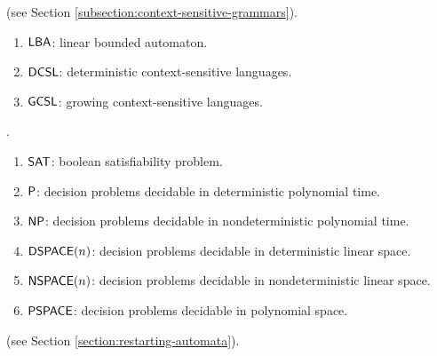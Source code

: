  (see Section \ref{subsection:context-sensitive-grammars}).

\begin{enumerate}[]
\item $\textup{\sf LBA}$: linear bounded automaton.
\item $\textup{\sf DCSL}$: deterministic context-sensitive languages.
\item $\textup{\sf GCSL}$: growing context-sensitive languages.
\end{enumerate}

.

\begin{enumerate}[]
\item $\textup{\sf SAT}$: boolean satisfiability problem.
\item $\textup{\sf P}$: decision problems decidable in deterministic polynomial time.
\item $\textup{\sf NP}$: decision problems decidable in nondeterministic polynomial time.
\item $\textup{\sf DSPACE}(n)$: decision problems decidable in deterministic linear space.
\item $\textup{\sf NSPACE}(n)$: decision problems decidable in nondeterministic linear space.
\item $\textup{\sf PSPACE}$: decision problems decidable in polynomial space.
\end{enumerate}

 (see Section \ref{section:restarting-automata}).

